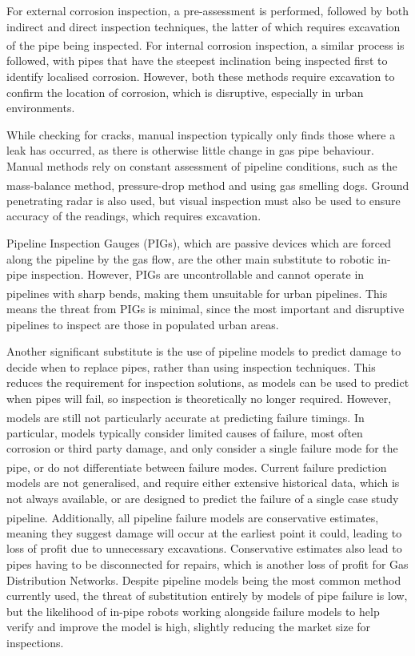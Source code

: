 \documentclass[11pt]{article}		%
\newcommand{\supercite}[1]{\textsuperscript{\cite{#1}}}		%
\begin{document}
				For external corrosion inspection, a pre-assessment is performed, followed by both indirect and direct inspection techniques, the latter of which requires excavation of the pipe being inspected\supercite{kishawy2010review}. 
				For internal corrosion inspection, a similar process is followed, with pipes that have the steepest inclination being inspected first to identify localised corrosion. 
				However, both these methods require excavation to confirm the location of corrosion, which is disruptive, especially in urban environments.
				
				While checking for cracks, manual inspection typically only finds those where a leak has occurred, as there is otherwise little change in gas pipe behaviour.
				Manual methods rely on constant assessment of pipeline conditions, such as the mass-balance method, pressure-drop method and using gas smelling dogs\supercite{kishawy2010review}.
				Ground penetrating radar is also used, but visual inspection must also be used to ensure accuracy of the readings, which requires excavation.
				
				Pipeline Inspection Gauges (PIGs), which are passive devices which are forced along the pipeline by the gas flow, are the other main substitute to robotic in-pipe inspection.
				However, PIGs are uncontrollable and cannot operate in pipelines with sharp bends\supercite{mills2017advances}, making them unsuitable for urban pipelines.
				This means the threat from PIGs is minimal, since the most important and disruptive pipelines to inspect are those in populated urban areas.
				
				Another significant substitute is the use of pipeline models to predict damage to decide when to replace pipes, rather than using inspection techniques.
				This reduces the requirement for inspection solutions, as models can be used to predict when pipes will fail, so inspection is theoretically no longer required.
				However, models are still not particularly accurate at predicting failure timings\supercite{zakikhani2020review}.
				In particular, models typically consider limited causes of failure, most often corrosion or third party damage, and only consider a single failure mode for the pipe, or  do not differentiate between failure modes\supercite{zakikhani2020review}.
				Current failure prediction models are not generalised, and require either extensive historical data, which is not always available, or are designed to predict the failure of a single case study pipeline\supercite{zakikhani2020review}.
				Additionally, all pipeline failure models are conservative estimates, meaning they suggest damage will occur at the earliest point it could, leading to loss of profit due to unnecessary excavations.
				Conservative estimates also lead to pipes having to be disconnected for repairs, which is another loss of profit for Gas Distribution Networks.
				Despite pipeline models being the most common method currently used, the threat of substitution entirely by models of pipe failure is low, but the likelihood of in-pipe robots working alongside failure models to help verify and improve the model is high, slightly reducing the market size for inspections. 
				
\end{document}
